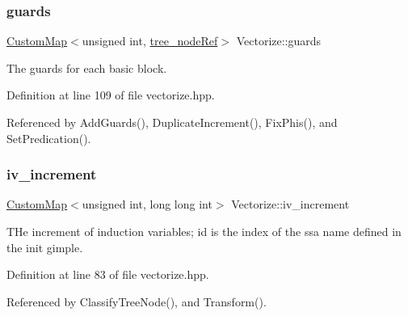 \mbox{\label{classVectorize_a7fa9592fc159a4d6c12cb9ce0d0d4ec8}} 
\subsubsection{\texorpdfstring{guards}{guards}}
{\footnotesize\ttfamily \hyperlink{custom__map_8hpp_a18ca01763abbe3e5623223bfe5aaac6b}{Custom\+Map}$<$unsigned int, \hyperlink{tree__node_8hpp_a6ee377554d1c4871ad66a337eaa67fd5}{tree\+\_\+node\+Ref}$>$ Vectorize\+::guards\hspace{0.3cm}{\ttfamily [private]}}



The guards for each basic block. 



Definition at line 109 of file vectorize.\+hpp.



Referenced by Add\+Guards(), Duplicate\+Increment(), Fix\+Phis(), and Set\+Predication().

\mbox{\label{classVectorize_a4a4c98fd5fb2cd313641f200da09a73d}} 
\subsubsection{\texorpdfstring{iv\+\_\+increment}{iv\_increment}}
{\footnotesize\ttfamily \hyperlink{custom__map_8hpp_a18ca01763abbe3e5623223bfe5aaac6b}{Custom\+Map}$<$unsigned int, long long int$>$ Vectorize\+::iv\+\_\+increment\hspace{0.3cm}{\ttfamily [private]}}



T\+He increment of induction variables; id is the index of the ssa name defined in the init gimple. 



Definition at line 83 of file vectorize.\+hpp.



Referenced by Classify\+Tree\+Node(), and Transform().

\mbox{\label{classVectorize_a07595ac2162b05302337bfe473b37a39}} 
